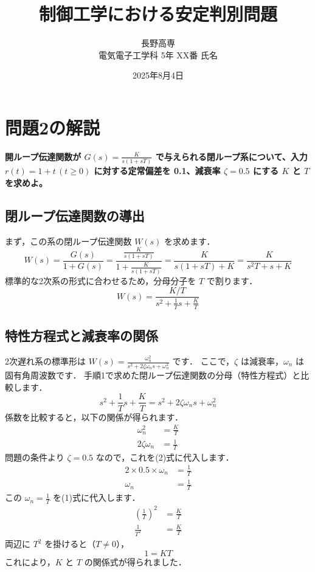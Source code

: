 \documentclass[11pt,a4paper]{ltjsarticle}
\begin{document}
\title{制御工学における安定判別問題}
\author{長野高専 \\電気電子工学科 5年 XX番 氏名}
\date{2025年8月4日}
\maketitle
\thispagestyle{fancy}

\section{問題2の解説}
\textbf{開ループ伝達関数が $G(s)=\frac{K}{s(1+sT)}$ で与えられる閉ループ系について、入力 $r(t)=1+t \, (t \ge 0)$ に対する定常偏差を 0.1、減衰率 $\zeta=0.5$ にする $K$ と $T$ を求めよ。}

\subsection{閉ループ伝達関数の導出}
まず，この系の閉ループ伝達関数 $W(s)$ を求めます．
\begin{equation*}
    W(s) = \frac{G(s)}{1+G(s)} = \frac{\frac{K}{s(1+sT)}}{1+\frac{K}{s(1+sT)}} = \frac{K}{s(1+sT)+K} = \frac{K}{s^2T+s+K}
\end{equation*}
標準的な2次系の形式に合わせるため，分母分子を $T$ で割ります．
\begin{equation*}
    W(s) = \frac{K/T}{s^2 + \frac{1}{T}s + \frac{K}{T}}
\end{equation*}

\subsection{特性方程式と減衰率の関係}
2次遅れ系の標準形は $W(s) = \frac{\omega_n^2}{s^2+2\zeta\omega_n s + \omega_n^2}$ です．
ここで，$\zeta$ は減衰率，$\omega_n$ は固有角周波数です．
手順1で求めた閉ループ伝達関数の分母（特性方程式）と比較します．
\begin{equation*}
    s^2 + \frac{1}{T}s + \frac{K}{T} = s^2+2\zeta\omega_n s + \omega_n^2
\end{equation*}
係数を比較すると，以下の関係が得られます．
\begin{align}
    \omega_n^2 &= \frac{K}{T} \\
    2\zeta\omega_n &= \frac{1}{T}
\end{align}
問題の条件より $\zeta=0.5$ なので，これを(2)式に代入します．
\begin{align*}
    2 \times 0.5 \times \omega_n &= \frac{1}{T} \\
    \omega_n &= \frac{1}{T}
\end{align*}
この $\omega_n = \frac{1}{T}$ を(1)式に代入します．
\begin{align*}
    \left(\frac{1}{T}\right)^2 &= \frac{K}{T} \\
    \frac{1}{T^2} &= \frac{K}{T}
\end{align*}
両辺に $T^2$ を掛けると（$T \neq 0$），
\begin{equation*}
    1 = KT
\end{equation*}
これにより，$K$ と $T$ の関係式が得られました．
\end{document}

